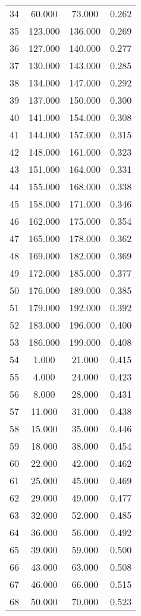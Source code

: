 \begin{tabular}{cccc}
  34 & 60.000 & 73.000 & 0.262 \\ 
  35 & 123.000 & 136.000 & 0.269 \\ 
  36 & 127.000 & 140.000 & 0.277 \\ 
  37 & 130.000 & 143.000 & 0.285 \\ 
  38 & 134.000 & 147.000 & 0.292 \\ 
  39 & 137.000 & 150.000 & 0.300 \\ 
  40 & 141.000 & 154.000 & 0.308 \\ 
  41 & 144.000 & 157.000 & 0.315 \\ 
  42 & 148.000 & 161.000 & 0.323 \\ 
  43 & 151.000 & 164.000 & 0.331 \\ 
  44 & 155.000 & 168.000 & 0.338 \\ 
  45 & 158.000 & 171.000 & 0.346 \\ 
  46 & 162.000 & 175.000 & 0.354 \\ 
  47 & 165.000 & 178.000 & 0.362 \\ 
  48 & 169.000 & 182.000 & 0.369 \\ 
  49 & 172.000 & 185.000 & 0.377 \\ 
  50 & 176.000 & 189.000 & 0.385 \\ 
  51 & 179.000 & 192.000 & 0.392 \\ 
  52 & 183.000 & 196.000 & 0.400 \\ 
  53 & 186.000 & 199.000 & 0.408 \\ 
  54 & 1.000 & 21.000 & 0.415 \\ 
  55 & 4.000 & 24.000 & 0.423 \\ 
  56 & 8.000 & 28.000 & 0.431 \\ 
  57 & 11.000 & 31.000 & 0.438 \\ 
  58 & 15.000 & 35.000 & 0.446 \\ 
  59 & 18.000 & 38.000 & 0.454 \\ 
  60 & 22.000 & 42.000 & 0.462 \\ 
  61 & 25.000 & 45.000 & 0.469 \\ 
  62 & 29.000 & 49.000 & 0.477 \\ 
  63 & 32.000 & 52.000 & 0.485 \\ 
  64 & 36.000 & 56.000 & 0.492 \\ 
  65 & 39.000 & 59.000 & 0.500 \\ 
  66 & 43.000 & 63.000 & 0.508 \\ 
  67 & 46.000 & 66.000 & 0.515 \\ 
  68 & 50.000 & 70.000 & 0.523 \\ 

\end{tabular}
